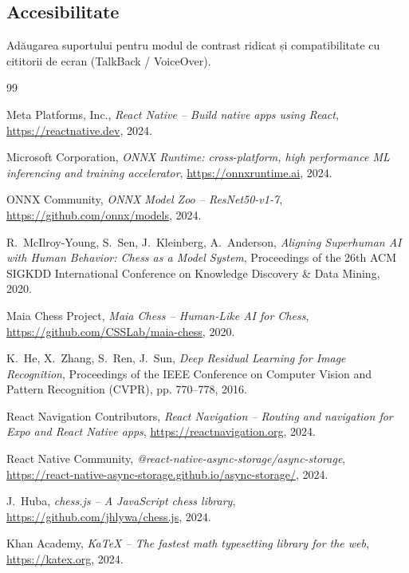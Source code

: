 \documentclass[12pt, a4paper, twoside]{report}
\numberwithin{equation}{section}
\begin{document}
\subsection{Accesibilitate}
Adăugarea suportului pentru modul de contrast ridicat și compatibilitate cu cititorii
de ecran (TalkBack / VoiceOver).

\begin{thebibliography}{99}

Meta Platforms, Inc.,
\textit{React Native -- Build native apps using React},
\url{https://reactnative.dev}, 2024.

Microsoft Corporation,
\textit{ONNX Runtime: cross-platform, high performance ML inferencing and training accelerator},
\url{https://onnxruntime.ai}, 2024.

ONNX Community,
\textit{ONNX Model Zoo -- ResNet50-v1-7},
\url{https://github.com/onnx/models}, 2024.

R.~McIlroy-Young, S.~Sen, J.~Kleinberg, A.~Anderson,
\textit{Aligning Superhuman AI with Human Behavior: Chess as a Model System},
Proceedings of the 26th ACM SIGKDD International Conference on Knowledge
Discovery \& Data Mining, 2020.

Maia Chess Project,
\textit{Maia Chess -- Human-Like AI for Chess},
\url{https://github.com/CSSLab/maia-chess}, 2020.

K.~He, X.~Zhang, S.~Ren, J.~Sun,
\textit{Deep Residual Learning for Image Recognition},
Proceedings of the IEEE Conference on Computer Vision and Pattern Recognition
(CVPR), pp. 770–778, 2016.

React Navigation Contributors,
\textit{React Navigation -- Routing and navigation for Expo and React Native apps},
\url{https://reactnavigation.org}, 2024.

React Native Community,
\textit{@react-native-async-storage/async-storage},
\url{https://react-native-async-storage.github.io/async-storage/}, 2024.

J.~Huba,
\textit{chess.js -- A JavaScript chess library},
\url{https://github.com/jhlywa/chess.js}, 2024.

Khan Academy,
\textit{KaTeX -- The fastest math typesetting library for the web},
\url{https://katex.org}, 2024.


\end{thebibliography}
\end{document}
